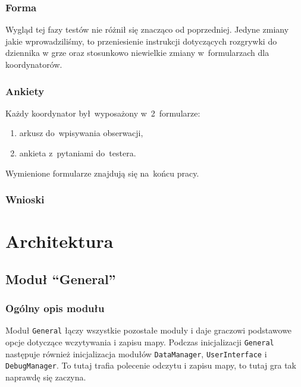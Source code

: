 \documentclass[licencjacka]{pracamgr}
\begin{document}
      \subsection{Forma}
      Wygląd tej fazy testów nie różnił się znacząco od poprzedniej. Jedyne zmiany jakie wprowadziliśmy,
      to przeniesienie instrukcji dotyczących rozgrywki do dziennika w grze oraz stosunkowo niewielkie zmiany
      w~formularzach dla koordynatorów.

      \subsection{Ankiety}
      Każdy koordynator był~wyposażony w~2~formularze:
      \begin{enumerate}
	\item arkusz do~wpisywania obserwacji,
	\item ankieta z~pytaniami do~testera.
      \end{enumerate}

      \noindent
      Wymienione formularze znajdują się na~końcu pracy.

      \subsection{Wnioski}

\chapter{Architektura}
  \section{Moduł ``General''}
    \subsection{Ogólny opis modułu}
      Moduł \texttt{General} łączy wszystkie pozostałe moduły i daje graczowi podstawowe opcje dotyczące wczytywania i zapisu
      mapy. Podczas inicjalizacji \texttt{General} następuje również inicjalizacja modułów \texttt{DataManager}, \texttt{UserInterface} i
      \texttt{DebugManager}. To tutaj trafia polecenie odczytu i zapisu mapy, to tutaj gra tak naprawdę się zaczyna.
\end{document}
